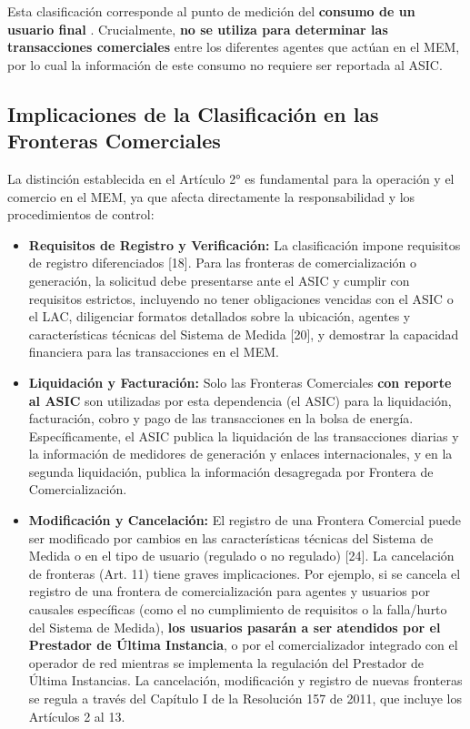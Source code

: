 \documentclass[a5paper]{book}%
\begin{document}
Esta clasificación corresponde al punto de medición del \textbf{consumo de un usuario final} . Crucialmente, \textbf{no se utiliza para determinar las transacciones comerciales} entre los diferentes agentes que actúan en el MEM, por lo cual la información de este consumo no requiere ser reportada al ASIC.

\subsection{Implicaciones de la Clasificación en las Fronteras Comerciales}

La distinción establecida en el Artículo 2° es fundamental para la operación y el comercio en el MEM, ya que afecta directamente la responsabilidad y los procedimientos de control:

\begin{itemize}
	\item \textbf{Requisitos de Registro y Verificación:} La clasificación impone requisitos de registro diferenciados [18]. Para las fronteras de comercialización o generación, la solicitud debe presentarse ante el ASIC y cumplir con requisitos estrictos, incluyendo no tener obligaciones vencidas con el ASIC o el LAC, diligenciar formatos detallados sobre la ubicación, agentes y características técnicas del Sistema de Medida [20], y demostrar la capacidad financiera para las transacciones en el MEM.
	\item \textbf{Liquidación y Facturación:} Solo las Fronteras Comerciales \textbf{con reporte al ASIC} son utilizadas por esta dependencia (el ASIC) para la liquidación, facturación, cobro y pago de las transacciones en la bolsa de energía. Específicamente, el ASIC publica la liquidación de las transacciones diarias y la información de medidores de generación y enlaces internacionales, y en la segunda liquidación, publica la información desagregada por Frontera de Comercialización.
	\item \textbf{Modificación y Cancelación:} El registro de una Frontera Comercial puede ser modificado por cambios en las características técnicas del Sistema de Medida o en el tipo de usuario (regulado o no regulado) [24]. La cancelación de fronteras (Art. 11) tiene graves implicaciones. Por ejemplo, si se cancela el registro de una frontera de comercialización para agentes y usuarios por causales específicas (como el no cumplimiento de requisitos o la falla/hurto del Sistema de Medida), \textbf{los usuarios pasarán a ser atendidos por el Prestador de Última Instancia}, o por el comercializador integrado con el operador de red mientras se implementa la regulación del Prestador de Última Instancias. La cancelación, modificación y registro de nuevas fronteras se regula a través del Capítulo I de la Resolución 157 de 2011, que incluye los Artículos 2 al 13.
\end{itemize}
  
\end{document}
